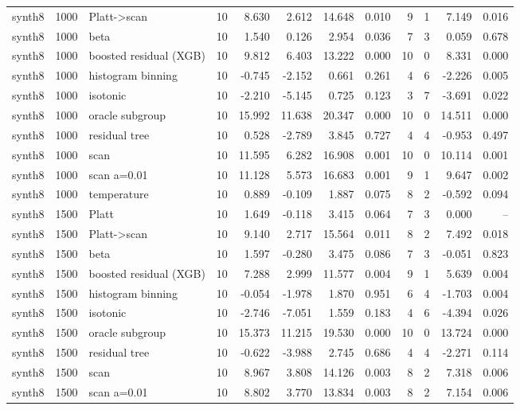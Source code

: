 \begin{tabular}{lllrrrrrrrrr}
synth8 & 1000 & Platt->scan & 10 & 8.630 & 2.612 & 14.648 & 0.010 & 9 & 1 & 7.149 & 0.016 \\
synth8 & 1000 & beta & 10 & 1.540 & 0.126 & 2.954 & 0.036 & 7 & 3 & 0.059 & 0.678 \\
synth8 & 1000 & boosted residual (XGB) & 10 & 9.812 & 6.403 & 13.222 & 0.000 & 10 & 0 & 8.331 & 0.000 \\
synth8 & 1000 & histogram binning & 10 & -0.745 & -2.152 & 0.661 & 0.261 & 4 & 6 & -2.226 & 0.005 \\
synth8 & 1000 & isotonic & 10 & -2.210 & -5.145 & 0.725 & 0.123 & 3 & 7 & -3.691 & 0.022 \\
synth8 & 1000 & oracle subgroup & 10 & 15.992 & 11.638 & 20.347 & 0.000 & 10 & 0 & 14.511 & 0.000 \\
synth8 & 1000 & residual tree & 10 & 0.528 & -2.789 & 3.845 & 0.727 & 4 & 4 & -0.953 & 0.497 \\
synth8 & 1000 & scan & 10 & 11.595 & 6.282 & 16.908 & 0.001 & 10 & 0 & 10.114 & 0.001 \\
synth8 & 1000 & scan a=0.01 & 10 & 11.128 & 5.573 & 16.683 & 0.001 & 9 & 1 & 9.647 & 0.002 \\
synth8 & 1000 & temperature & 10 & 0.889 & -0.109 & 1.887 & 0.075 & 8 & 2 & -0.592 & 0.094 \\
synth8 & 1500 & Platt & 10 & 1.649 & -0.118 & 3.415 & 0.064 & 7 & 3 & 0.000 & -- \\
synth8 & 1500 & Platt->scan & 10 & 9.140 & 2.717 & 15.564 & 0.011 & 8 & 2 & 7.492 & 0.018 \\
synth8 & 1500 & beta & 10 & 1.597 & -0.280 & 3.475 & 0.086 & 7 & 3 & -0.051 & 0.823 \\
synth8 & 1500 & boosted residual (XGB) & 10 & 7.288 & 2.999 & 11.577 & 0.004 & 9 & 1 & 5.639 & 0.004 \\
synth8 & 1500 & histogram binning & 10 & -0.054 & -1.978 & 1.870 & 0.951 & 6 & 4 & -1.703 & 0.004 \\
synth8 & 1500 & isotonic & 10 & -2.746 & -7.051 & 1.559 & 0.183 & 4 & 6 & -4.394 & 0.026 \\
synth8 & 1500 & oracle subgroup & 10 & 15.373 & 11.215 & 19.530 & 0.000 & 10 & 0 & 13.724 & 0.000 \\
synth8 & 1500 & residual tree & 10 & -0.622 & -3.988 & 2.745 & 0.686 & 4 & 4 & -2.271 & 0.114 \\
synth8 & 1500 & scan & 10 & 8.967 & 3.808 & 14.126 & 0.003 & 8 & 2 & 7.318 & 0.006 \\
synth8 & 1500 & scan a=0.01 & 10 & 8.802 & 3.770 & 13.834 & 0.003 & 8 & 2 & 7.154 & 0.006 \\

\end{tabular}
